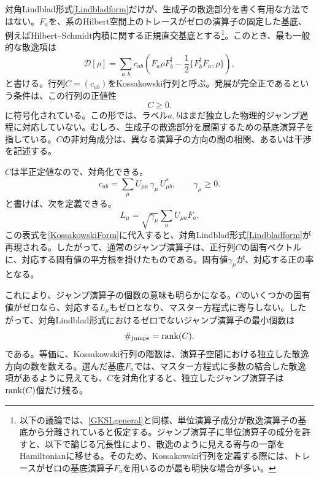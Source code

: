 \documentclass[a4paper,11pt,oneside]{article}
\theoremstyle{definition}
\numberwithin{equation}{section}
\begin{document}
対角Lindblad形式\eqref{Lindbladform}だけが、生成子の散逸部分を書く有用な方法ではない。${F_a}$を、系のHilbert空間上のトレースがゼロの演算子の固定した基底、例えばHilbert--Schmidt内積に関する正規直交基底とする\footnote{以下の議論では、\eqref{GKSLgeneral}と同様、単位演算子成分が散逸演算子の基底から分離されていると仮定する。ジャンプ演算子に単位演算子の成分を許すと、以下で論じる冗長性により、散逸のように見える寄与の一部をHamiltonianに移せる。そのため、Kossakowski行列を定義する際には、トレースがゼロの基底演算子$F_a$を用いるのが最も明快な場合が多い。}。このとき、最も一般的な散逸項は
\begin{equation}\label{KossakowskiForm}
\mathcal D[\rho]=\sum_{a,b} c_{ab}\left(F_a \rho F_b^\dagger-\frac12 \{F_b^\dagger F_a,\rho \}\right) ,
\end{equation}
と書ける。行列$C=(c_{ab})$をKossakowski行列と呼ぶ。発展が完全正であるという条件は、この行列の正値性
\begin{equation}
C\geq 0 .
\end{equation}
に符号化されている。この形では、ラベル$a,b$はまだ独立した物理的ジャンプ過程に対応していない。むしろ、生成子の散逸部分を展開するための基底演算子を指している。$C$の非対角成分は、異なる演算子の方向の間の相関、あるいは干渉を記述する。



$C$は半正定値なので、対角化できる。
\begin{equation}
c_{ab}=\sum_\mu U_{\mu a}\,\gamma_\mu\,U_{\mu b}^{*} ,\qquad \gamma_\mu\geq 0 .
\end{equation}
と書けば、次を定義できる。
\begin{equation}\label{diagonaljumps}
L_\mu=\sqrt{\gamma_\mu}\sum_a U_{\mu a}F_a .
\end{equation}
この表式を\eqref{KossakowskiForm}に代入すると、対角Lindblad形式\eqref{Lindbladform}が再現される。したがって、通常のジャンプ演算子は、正行列$C$の固有ベクトルに、対応する固有値の平方根を掛けたものである。固有値$\gamma_\mu$が、対応する正の率となる。



これにより、ジャンプ演算子の個数の意味も明らかになる。$C$のいくつかの固有値がゼロなら、対応する$L_\mu$もゼロとなり、マスター方程式に寄与しない。したがって、対角Lindblad形式におけるゼロでないジャンプ演算子の最小個数は
\begin{equation}
\#_{\rm jumps}={\rm rank}(C).
\end{equation}
である。等価に、Kossakowski行列の階数は、演算子空間における独立した散逸方向の数を数える。選んだ基底${F_a}$では、マスター方程式に多数の結合した散逸項があるように見えても、$C$を対角化すると、独立したジャンプ演算子は${\rm rank}(C)$個だけ残る。
\end{document}
